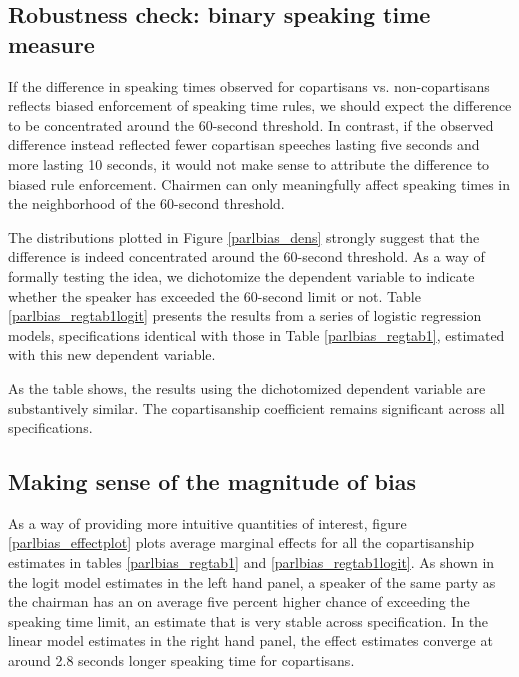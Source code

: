 \documentclass[12pt,a4paper]{article}
\begin{document}
\subsection{Robustness check: binary speaking time measure}

If the difference in speaking times observed for copartisans vs. non-copartisans reflects biased enforcement of speaking time rules, we should expect the difference to be concentrated around the 60-second threshold. In contrast, if the observed difference instead reflected fewer copartisan speeches lasting five seconds and more lasting 10 seconds, it would not make sense to attribute the difference to biased rule enforcement. Chairmen can only meaningfully affect speaking times in the neighborhood of the 60-second threshold. 

The distributions plotted in Figure \ref{parlbias_dens} strongly suggest that the difference is indeed concentrated around the 60-second threshold. As a way of formally testing the idea, we dichotomize the dependent variable to indicate whether the speaker has exceeded the 60-second limit or not. Table \ref{parlbias_regtab1logit} presents the results from a series of logistic regression models, specifications identical with those in Table \ref{parlbias_regtab1}, estimated with this new dependent variable.



As the table shows, the results using the dichotomized dependent variable are substantively similar. The copartisanship coefficient remains significant across all specifications. 

\subsection{Making sense of the magnitude of bias}
As a way of providing more intuitive quantities of interest, figure \ref{parlbias_effectplot} plots average marginal effects for all the copartisanship estimates in tables \ref{parlbias_regtab1} and \ref{parlbias_regtab1logit}. As shown in the logit model estimates in the left hand panel, a speaker of the same party as the chairman has an on average five percent higher chance of exceeding the speaking time limit, an estimate that is very stable across specification. In the linear model estimates in the right hand panel, the effect estimates converge at around 2.8  seconds longer speaking time for copartisans.
\end{document}
